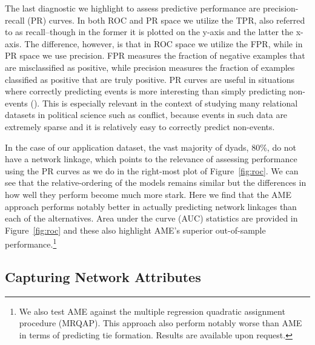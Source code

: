 \documentclass[12pt,pdflatex]{elsarticle}
\begin{document}
The last diagnostic we highlight to assess predictive performance are precision-recall (PR) curves. In both ROC and PR space we utilize the TPR, also referred to as recall--though in the former it is plotted on the y-axis and the latter the x-axis. The difference, however, is that in ROC space we utilize the FPR, while in PR space we use precision. FPR measures the fraction of negative examples that are misclassified as positive, while precision measures the fraction of examples classified as positive that are truly positive. PR curves are useful in situations where correctly predicting events is more interesting than simply predicting non-events (\citealt{davis:goadrich:2006}). This is especially relevant in the context of studying many relational datasets in political science such as conflict, because events in such data are extremely sparse and it is relatively easy to correctly predict non-events. 

In the case of our application dataset, the vast majority of dyads, 80\%, do not have a network linkage, which points to the relevance of assessing performance using the PR curves as we do in the right-most plot of Figure~\ref{fig:roc}. We can see that the relative-ordering of the models remains similar but the differences in how well they perform become much more stark. Here we find that the AME approach performs notably better in actually predicting network linkages than each of the alternatives. Area under the curve (AUC) statistics are provided in Figure~\ref{fig:roc} and these also highlight AME's superior out-of-sample performance.\footnote{We also test AME against the multiple regression quadratic assignment procedure (MRQAP). This approach also perform notably worse than AME in terms of predicting tie formation. Results are available upon request.}

\FloatBarrier

\subsection*{Capturing Network Attributes}
\end{document}

